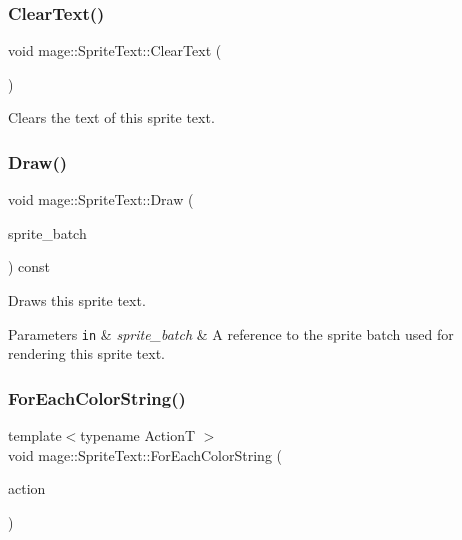 \subsubsection{\texorpdfstring{Clear\+Text()}{ClearText()}}
{\footnotesize\ttfamily void mage\+::\+Sprite\+Text\+::\+Clear\+Text (\begin{DoxyParamCaption}{ }\end{DoxyParamCaption})\hspace{0.3cm}{\ttfamily [noexcept]}}

Clears the text of this sprite text. \hypertarget{classmage_1_1_sprite_text_a7db90f9aaebdda3cf9410c11729fd609}{}\label{classmage_1_1_sprite_text_a7db90f9aaebdda3cf9410c11729fd609} 
\subsubsection{\texorpdfstring{Draw()}{Draw()}}
{\footnotesize\ttfamily void mage\+::\+Sprite\+Text\+::\+Draw (\begin{DoxyParamCaption}\item[{\hyperlink{classmage_1_1_sprite_batch}{Sprite\+Batch} \&}]{sprite\+\_\+batch }\end{DoxyParamCaption}) const}

Draws this sprite text.


\begin{DoxyParams}[1]{Parameters}
\mbox{\tt in}  & {\em sprite\+\_\+batch} & A reference to the sprite batch used for rendering this sprite text. \\
\hline
\end{DoxyParams}
\hypertarget{classmage_1_1_sprite_text_ad975957b908ad3926ace75fb60ff4474}{}\label{classmage_1_1_sprite_text_ad975957b908ad3926ace75fb60ff4474} 
\subsubsection{\texorpdfstring{For\+Each\+Color\+String()}{ForEachColorString()}\hspace{0.1cm}{\footnotesize\ttfamily [1/2]}}
{\footnotesize\ttfamily template$<$typename ActionT $>$ \\
void mage\+::\+Sprite\+Text\+::\+For\+Each\+Color\+String (\begin{DoxyParamCaption}\item[{ActionT}]{action }\end{DoxyParamCaption})}

